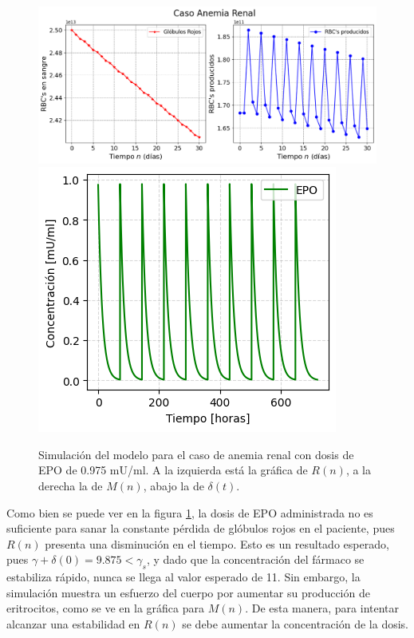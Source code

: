 \begin{figure}[H]
    \centering
    \captionsetup{justification=centering}
    \includegraphics[scale=0.534]{figures/AR11.png}
    \includegraphics[scale=0.8]{figures/AR12.png}
    \caption{Simulación del modelo para el caso de anemia renal con dosis de EPO de 0.975 mU/ml. A la izquierda está la gráfica de $R(n)$, a la derecha la de $M(n)$, abajo la de $\delta(t)$.}
    \label{sec:variaciones:fig:Anemia1}
\end{figure}

Como bien se puede ver en la figura \ref{sec:variaciones:fig:Anemia1}, la dosis de EPO administrada no es suficiente para sanar la constante pérdida de glóbulos rojos en el paciente, pues $R(n)$ presenta una disminución en el tiempo. Esto es un resultado esperado, pues $\gamma + \delta(0)=9.875 < \gamma_s$, y dado que la concentración del fármaco se estabiliza rápido, nunca se llega al valor esperado de 11. Sin embargo, la simulación muestra un esfuerzo del cuerpo por aumentar su producción de eritrocitos, como se ve en la gráfica para $M(n)$. De esta manera, para intentar alcanzar una estabilidad en $R(n)$ se debe aumentar la concentración de la dosis.

